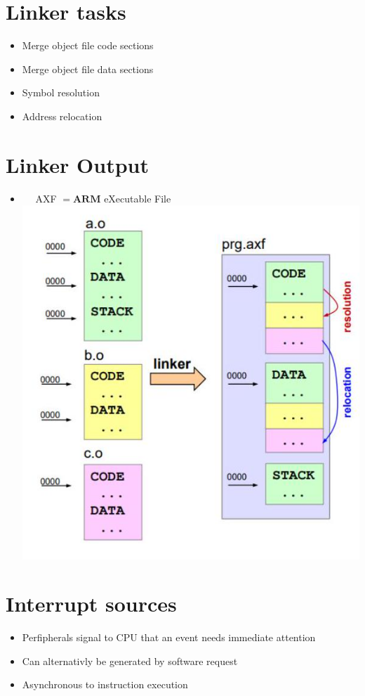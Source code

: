 \documentclass[10pt]{article}
\begin{document}
\section*{Linker tasks}
\begin{itemize}
  \item Merge object file code sections
  \item Merge object file data sections
  \item Symbol resolution
  \item Address relocation
\end{itemize}

\section*{Linker Output}
\begin{itemize}
  \item $\quad$ AXF $=\mathbf{A R M}$ eXecutable File\\
\includegraphics[width=\linewidth]{images/2024_12_29_79e6b22f503fb7b4f718g-10}
\end{itemize}

\section*{Interrupt sources}
\begin{itemize}
  \item Perfipherals signal to CPU that an event needs immediate attention
  \item Can alternativly be generated by software request
  \item Asynchronous to instruction execution
\end{itemize}
\end{document}
